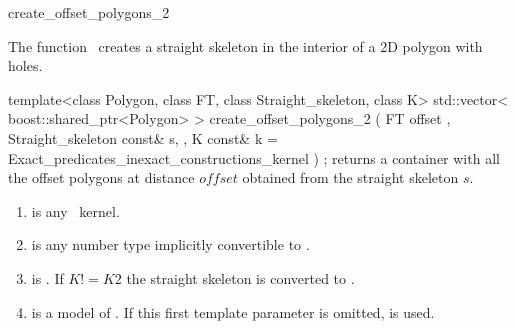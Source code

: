 

\begin{ccRefFunction}{create_offset_polygons_2}


\ccDefinition

The function \ccRefName\ creates a straight skeleton in the interior of a 2D polygon with holes.


\ccFunction
{template<class Polygon, class FT, class Straight_skeleton, class K>
std::vector< boost::shared_ptr<Polygon> >
create_offset_polygons_2 ( FT                       offset
                         , Straight_skeleton const& s,
                         , K const&                 k = Exact_predicates_inexact_constructions_kernel
                         ) ;
}
{returns a container with all the offset polygons at distance $offset$ obtained from 
the straight skeleton $s$. 
}


\begin{enumerate}  
   \item    {} is any \cgal\ kernel.
   \item    {} is any number type implicitly convertible to .
   \item    {} is . 
            If $K != K2$ the straight skeleton is converted to .
   \item    {} is a model of . 
            If this first template parameter is omitted,  is used.
\end{enumerate}


\ccSeeAlso
{}\\
\\
\\
\\

\end{ccRefFunction}


